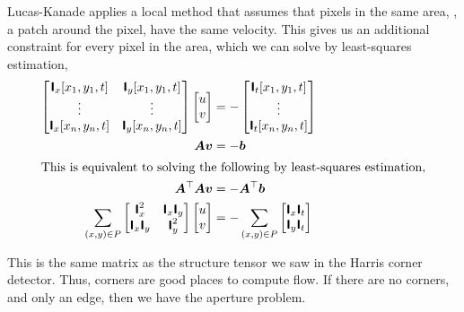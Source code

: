 Lucas-Kanade applies a local method that assumes that pixels in the same
area, \ie, a patch around the pixel, have the same velocity. This gives us an
additional constraint for every pixel in the area, which we can solve by
least-squares estimation,
\begin{align*}
    \begin{bmatrix}
        \bm{\mathsf{I}}_x[x_1,y_1,t] & \bm{\mathsf{I}}_y[x_1,y_1,t] \\
        \vdots                & \vdots                \\
        \bm{\mathsf{I}}_x[x_n,y_n,t] & \bm{\mathsf{I}}_y[x_n,y_n,t]
    \end{bmatrix}
    \begin{bmatrix}
        u \\ v
    \end{bmatrix}
                                      & =
    -\begin{bmatrix}
         \bm{\mathsf{I}}_t[x_1,y_1,t] \\
         \vdots                \\
         \bm{\mathsf{I}}_t[x_n,y_n,t]
     \end{bmatrix}                                            \\
    \bm{A}\bm{v}                    & = -\bm{b}                    \\
    \intertext{This is equivalent to solving the following by least-squares
        estimation,}
    \bm{A}^\top\bm{A}\bm{v} & = -\bm{A}^\top\bm{b} \\
    \sum_{(x,y)\in P}
    \begin{bmatrix}
        \bm{\mathsf{I}}_x^2          & \bm{\mathsf{I}}_x \bm{\mathsf{I}}_y \\
        \bm{\mathsf{I}}_x \bm{\mathsf{I}}_y & \bm{\mathsf{I}}_y^2
    \end{bmatrix}
    \begin{bmatrix}
        u \\ v
    \end{bmatrix}
                                      & =
    - \sum_{(x,y)\in P}
    \begin{bmatrix}
        \bm{\mathsf{I}}_x \bm{\mathsf{I}}_t \\
        \bm{\mathsf{I}}_y \bm{\mathsf{I}}_t \\
    \end{bmatrix}
\end{align*}

This is the same matrix as the structure tensor we saw in the Harris corner
detector. Thus, corners are good places to compute flow. If there are no
corners, and \eg only an edge, then we have the aperture problem.


